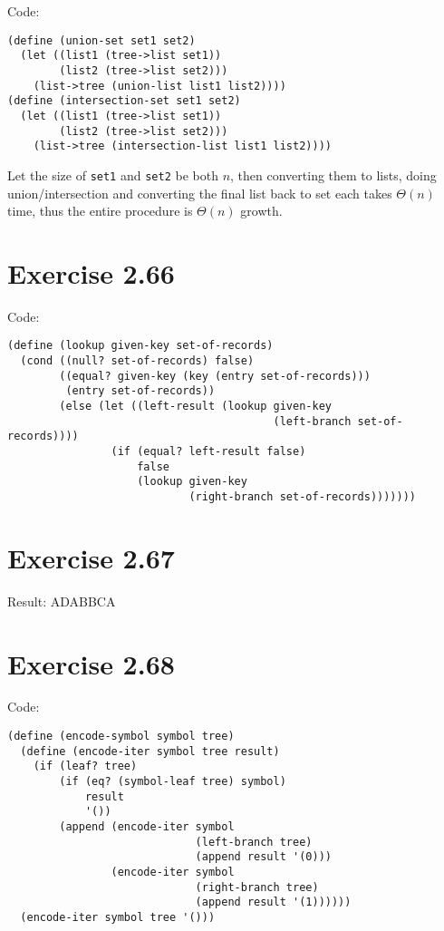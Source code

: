 \documentclass[../main.tex]{subfiles}
\begin{document}
Code:

\begin{lstlisting}
(define (union-set set1 set2)
  (let ((list1 (tree->list set1))
        (list2 (tree->list set2)))
    (list->tree (union-list list1 list2))))
(define (intersection-set set1 set2)
  (let ((list1 (tree->list set1))
        (list2 (tree->list set2)))
    (list->tree (intersection-list list1 list2))))
\end{lstlisting}

Let the size of \lstinline{set1} and \lstinline{set2}
 be both $n$, then converting them to lists, doing
 union/intersection and converting the final list back
 to set each takes $\Theta(n)$ time, thus the entire
 procedure is $\Theta(n)$ growth.

\section{Exercise 2.66}

Code:

\begin{lstlisting}
(define (lookup given-key set-of-records)
  (cond ((null? set-of-records) false)
        ((equal? given-key (key (entry set-of-records)))
         (entry set-of-records))
        (else (let ((left-result (lookup given-key
                                         (left-branch set-of-records))))
                (if (equal? left-result false)
                    false
                    (lookup given-key
                            (right-branch set-of-records)))))))
\end{lstlisting}

\section{Exercise 2.67}

Result: ADABBCA

\section{Exercise 2.68}

Code:

\begin{lstlisting}
(define (encode-symbol symbol tree)
  (define (encode-iter symbol tree result)
    (if (leaf? tree)
        (if (eq? (symbol-leaf tree) symbol)
            result
            '())
        (append (encode-iter symbol
                             (left-branch tree)
                             (append result '(0)))
                (encode-iter symbol
                             (right-branch tree)
                             (append result '(1))))))
  (encode-iter symbol tree '()))
\end{lstlisting}
\end{document}
